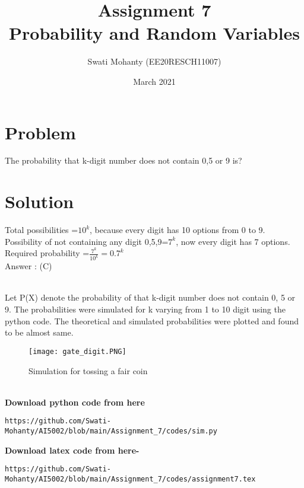 \documentclass[journal,12pt,twocolumn]{IEEEtran}
\title{Assignment 7
\\Probability and Random Variables }
\author{Swati Mohanty (EE20RESCH11007) }
\date{March 2021}
\begin{document}
\maketitle


\section{Problem}
The probability that k-digit number does not contain 0,5 or 9 is?

\section{Solution}
Total possibilities =$10^k$, because every digit has 10 options from 0 to 9.
\\Possibility of not containing any digit 0,5,9=$7^k$, now every digit has 7 options.
Required probability =$\frac{7^k}{10^k}=0.7^k$ 
\\Answer : \boldsymbol(C)

\\Let P(X) denote the probability of that k-digit number does not contain 0, 5 or 9. The probabilities were simulated for k varying from 1 to 10 digit using the python code. The theoretical and simulated probabilities were plotted and found to be almost same.
\begin{figure}[h]
\renewcommand{\theenumi}{1}
\centering
\texttt{[image: gate\_digit.PNG]}
\caption{Simulation for tossing a fair coin  }
\label{Fig:1}
\end{figure}
\\\textbf{Download python code from here}\\
\begin{lstlisting}
https://github.com/Swati-Mohanty/AI5002/blob/main/Assignment_7/codes/sim.py
\end{lstlisting}
\textbf{Download latex code from here-}\\
\begin{lstlisting}
https://github.com/Swati-Mohanty/AI5002/blob/main/Assignment_7/codes/assignment7.tex
\end{lstlisting}
\end{document}
